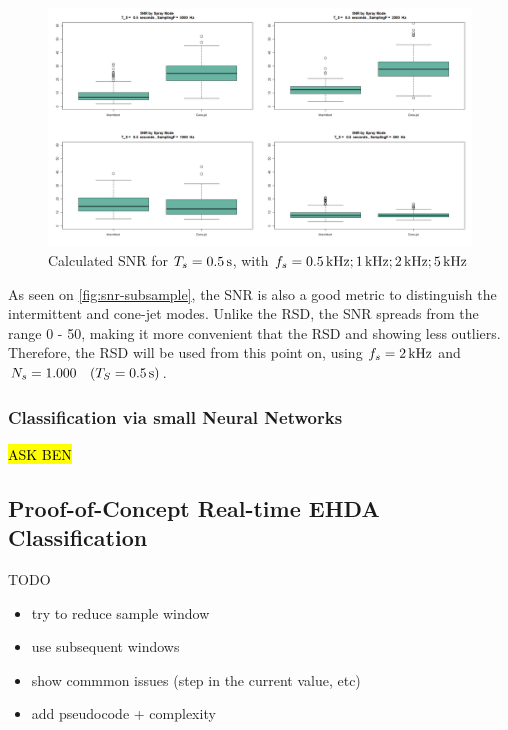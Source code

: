 \documentclass[oneside,12pt]{article}
\begin{document}
\begin{figure}[h!]
    \centering
    \includegraphics[width=\textwidth,trim=1 1 1 1,clip]{figures/snr-subsample.png}
    \caption{Calculated SNR for $T_s = 0.5 \,\mathrm{s}$, with $f_s = 0.5 \,\mathrm{kHz}; 1 \,\mathrm{kHz}; 2 \,\mathrm{kHz}; 5 \,\mathrm{kHz}$}
    \label{fig:snr-subsample}
\end{figure}

As seen on \autoref{fig:snr-subsample}, the SNR is also a good metric to distinguish the intermittent and cone-jet modes.
Unlike the RSD, the SNR spreads from the range 0 - 50, making it more convenient that the RSD and showing less outliers. 
Therefore, the RSD will be used from this point on, using $f_s = 2 \,\mathrm{kHz}$ and $N_s = 1.000 \quad (T_S = 0.5 \,\mathrm{s})$. 

\subsubsection{Classification via small Neural Networks}

\hl{ASK BEN}

\subsection{Proof-of-Concept Real-time EHDA Classification}\label{sec:classification-algorithm}

TODO
\begin{itemize}
    \item try to reduce sample window
    \item use subsequent windows
    \item show commmon issues (step in the current value, etc)
    \item add pseudocode + complexity
\end{itemize}
\end{document}
